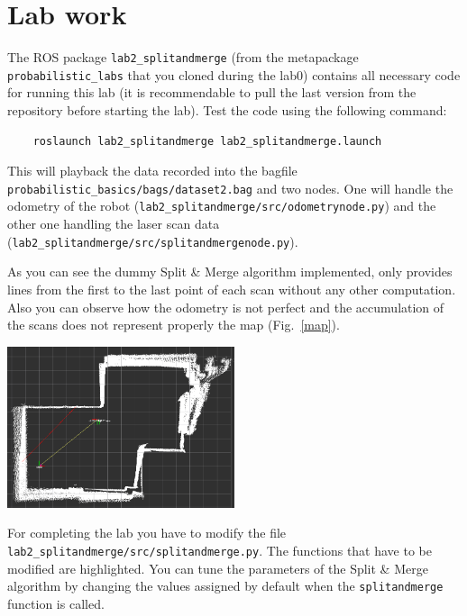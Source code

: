 \documentclass[a4paper,10pt]{article}
\begin{document}
\section{Lab work}

The ROS package \texttt{lab2\_splitandmerge} (from the metapackage \texttt{probabilistic\_labs} that you cloned during the lab0) contains all necessary code for running this lab (it is recommendable to pull the last version from the repository before starting the lab). Test the code using the following command:

\begin{verbatim}
    roslaunch lab2_splitandmerge lab2_splitandmerge.launch
\end{verbatim}

This will playback the data recorded into the bagfile \texttt{probabilistic\_basics/bags/dataset2.bag} and two nodes. One will handle the odometry of the robot (\texttt{lab2\_splitandmerge/src/odometrynode.py}) and the other one handling the laser scan data (\texttt{lab2\_splitandmerge/src/splitandmergenode.py}).

As you can see the dummy Split \& Merge algorithm implemented, only provides lines from the first to the last point of each scan without any other computation. Also you can observe how
the odometry is not perfect and the accumulation of the scans does not represent properly the map (Fig.~\ref{map}).

\begin{center}
	\includegraphics[width=0.50\textwidth]{lab2-scans}
	\label{map}
\end{center}

For completing the lab you have to modify the file \texttt{lab2\_splitandmerge/src/splitandmerge.py}. The functions that have to be modified are highlighted. You can tune the parameters of the Split \& Merge algorithm by changing the values assigned by default when the \texttt{splitandmerge} function is called.
\end{document}
